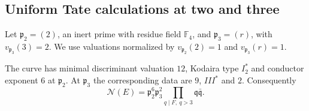 \subsection{Uniform Tate calculations at two and three}

Let $\mathfrak p_2=(2)$, an inert prime with residue field $\mathbb F_4$,
and $\mathfrak p_3=(r)$, with $v_{\mathfrak p_3}(3)=2$.
We use valuations normalized by $v_{\mathfrak p_2}(2)=1$ and
$v_{\mathfrak p_3}(r)=1$.

\begin{theorem}
\label{fm-quadratic-conductor}
The curve has minimal discriminant valuation $12$, Kodaira type $I_2^*$
and conductor exponent $6$ at $\mathfrak p_2$. At $\mathfrak p_3$ the
corresponding data are $9$, $III^*$ and $2$. Consequently
\begin{equation}\label{fm-exact-conductor}
 \mathcal N(E)=\mathfrak p_2^6\mathfrak p_3^2
       \prod_{q\mid F,\ q>3}\mathfrak q\bar{\mathfrak q}.
\end{equation}
\end{theorem}
